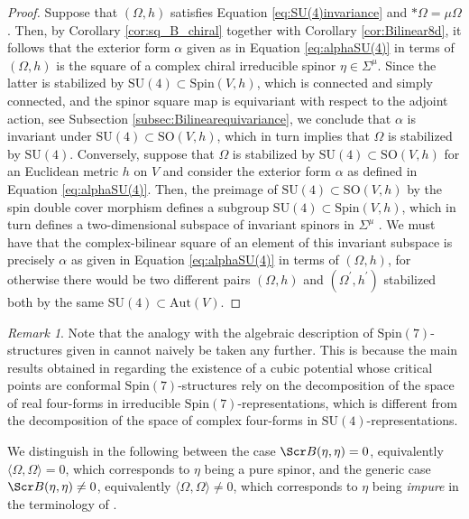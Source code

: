 \documentclass[10pt,a4paper,twoside,reqno]{amsart}
\theoremstyle{plain}
\theoremstyle{definition}
\theoremstyle{remark}
\newtheorem{remark}[thm]{Remark}
\newcommand{\Aut}{\mathrm{Aut}}
\def\scB{\Scr B}
\def\Spin{\mathrm{Spin}}
\def\Spin{\mathrm{Spin}}
\def\SO{\mathrm{SO}}
\def\SU{\mathrm{SU}}
\def\Aut{\mathrm{Aut}}
\begin{document}
\begin{proof}
Suppose that $(\Omega,h)$ satisfies Equation \eqref{eq:SU(4)invariance} and $*\Omega=\mu\Omega$. Then, by Corollary \ref{cor:sq_B_chiral} together with Corollary \ref{cor:Bilinear8d}, it follows that the exterior form $\alpha$ given as in Equation \eqref{eq:alphaSU(4)} in terms of $(\Omega,h)$ is the square of a complex chiral irreducible spinor $\eta\in \Sigma^{\mu}$. Since the latter is stabilized by $\SU(4)\subset \Spin(V,h)$, which is connected and simply connected, and the spinor square map is equivariant with respect to the adjoint action, see Subsection \ref{subsec:Bilinearequivariance}, we conclude that $\alpha$ is invariant under $\SU(4)\subset \SO(V,h)$, which in turn implies that $\Omega$ is stabilized by $\SU(4)$. Conversely, suppose that $\Omega$ is stabilized by $\SU(4)\subset \SO(V,h)$ for an Euclidean metric $h$ on $V$ and consider the exterior form $\alpha$ as defined in Equation \eqref{eq:alphaSU(4)}. Then, the preimage of $\SU(4)\subset \SO(V,h)$ by the spin double cover morphism defines a subgroup $\SU(4)\subset \Spin(V,h)$, which in turn defines a two-dimensional subspace of invariant spinors in $\Sigma^{\mu}$ \cite{Wang89}. We must have that the complex-bilinear square of an element of this invariant subspace is precisely $\alpha$ as given in Equation \eqref{eq:alphaSU(4)} in terms of $(\Omega,h)$, for otherwise there would be two different pairs $(\Omega,h)$ and $(\Omega^{\prime},h^{\prime})$ stabilized both by the same $\SU(4)\subset\Aut(V)$.
\end{proof}

\begin{remark}
Note that the analogy with the algebraic description of $\Spin(7)$-structures given in \cite{LS24_Spin7} cannot naively be taken any further. This is because the main results obtained in \cite{LS24_Spin7} regarding the existence of a cubic potential whose critical points are conformal $\Spin(7)$-structures rely on the decomposition of the space of real four-forms in irreducible $\Spin(7)$-representations, which is different from the decomposition of the space of complex four-forms in $\SU(4)$-representations.
\end{remark}

\noindent
We distinguish in the following between the case $\scB(\eta,\eta) = 0$, equivalently $\langle \Omega , \Omega \rangle = 0$, which corresponds to $\eta$ being a pure spinor, and the generic case $\scB(\eta,\eta) \neq 0$, equivalently $\langle \Omega , \Omega \rangle \neq 0$, which corresponds to $\eta$ being \emph{impure} in the terminology of \cite{CharltonThesis}.
\end{document}
